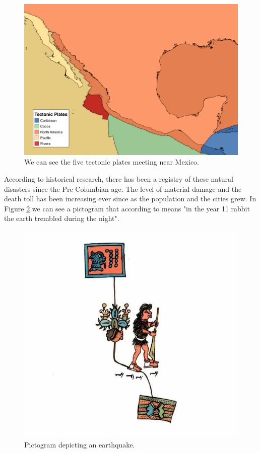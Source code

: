 \begin{figure}[h]
  \centering
  \includegraphics[width=1\textwidth]{images/plates.png}
  \caption{We can see the five tectonic plates meeting near Mexico.}
  \label{fig:plates}
\end{figure}


According to historical research, there has been a registry of these natural disasters since the Pre-Columbian age. The level of material damage and the death toll has been increasing ever since as the population and the cities grew. In Figure \ref{fig:pictogram} we can see a pictogram that according to \cite{sismosmexico} means "in the year 11 rabbit the earth trembled during the night".\\


\begin{figure}[h]
  \centering
  \includegraphics[width=1\textwidth]{images/codice.jpg}
  \caption{Pictogram depicting an earthquake.}
  \label{fig:pictogram}
\end{figure}


